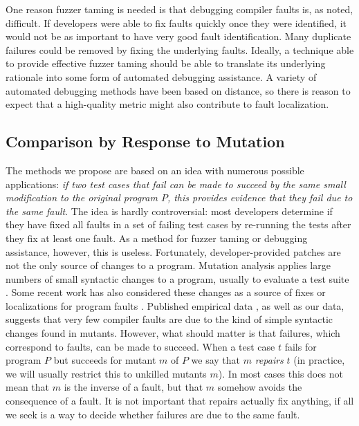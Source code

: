 One reason fuzzer taming is needed is that debugging compiler faults is, as noted, difficult.  If developers were able to fix faults quickly once they were identified, it would not be as important to have very good fault identification.  Many duplicate failures could be removed by fixing the underlying faults.  Ideally, a technique able to provide effective fuzzer taming should be able to translate its underlying rationale into some form of automated debugging assistance.   A variety of automated debugging methods \cite{NearNeighbor,GroceError} have been based on distance, so there is reason to expect that a high-quality metric might also contribute to fault localization.

\subsection{Comparison by Response to Mutation}

The methods we propose are based on an idea with numerous possible applications: \emph{if two test cases that fail can be made to succeed by the same small modification to the original program $P$, this provides evidence that they fail due to the same fault}.  The idea is hardly controversial:  most developers determine if they have fixed all faults in a set of failing test cases by re-running the tests after they fix at least one fault.  As a method for fuzzer taming or debugging assistance, however, this is useless.  Fortunately, developer-provided patches are not the only source of changes to a program.  Mutation analysis \cite{demillo1978hints,budd1980theoretical} applies large numbers of small syntactic changes to a program, usually to evaluate a test suite \cite{mutant,justmutants}.  Some recent work has also considered these changes as a source of fixes or localizations for program faults \cite{achour,multilingual,MUSE,DebroyMutant}.  Published empirical data \cite{GopinathMutants}, as well as our data, suggests that very few compiler faults are due to the kind of simple syntactic changes found in mutants.  However, what should matter is that failures, which correspond to faults, can be made to succeed.  When a test case $t$ fails for program $P$ but succeeds for mutant $m$ of $P$ we say that $m$ \emph{repairs} $t$ (in practice, we will usually restrict this to unkilled mutants $m$).  In most cases this does not mean that $m$ is the inverse of a fault, but that $m$ somehow avoids the consequence of a fault.  It is not important that repairs actually fix anything, if all we seek is a way to decide whether failures are due to the same fault.


